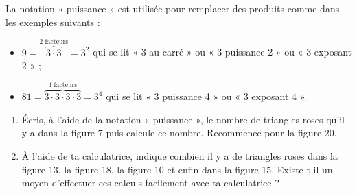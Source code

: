 \begin{activite}
\begin{partie}
La notation « puissance » est utilisée pour remplacer des produits comme dans les exemples suivants :
\begin{itemize}
 \item $9 = \stackrel{2 \text{ facteurs}}{\overbrace{3 \cdot 3}} = 3^2$ qui se lit « 3 au carré » ou « 3 puissance 2 » ou « 3 exposant 2 » ;
 \item $81 = \stackrel{4 \text{ facteurs}}{\overbrace{3 \cdot 3 \cdot 3 \cdot 3}} = 3^4$ qui se lit « 3 puissance 4 » ou « 3 exposant 4 ».
 \end{itemize}
\begin{enumerate}
 \item Écris, à l'aide de la notation « puissance », le nombre de triangles roses qu'il y a dans la figure 7 puis calcule ce nombre. Recommence pour la figure 20.
 \item À l'aide de ta calculatrice, indique combien il y a de triangles roses dans la figure 13, la figure 18, la figure 10 et enfin dans la figure 15. Existe-t-il un moyen d'effectuer ces calculs facilement avec ta calculatrice ?
 \end{enumerate}
\end{partie}

\end{activite}


